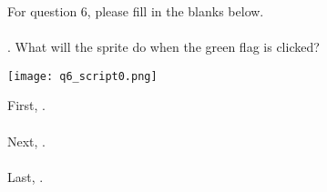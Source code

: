 \noindent For question 6, please fill in the blanks below. \\ \\
. What will the sprite do when the green flag is clicked?
\begin{center}
\texttt{[image: q6\_script0.png]}
\end{center}

\noindent First, \hrulefill . \\ \\
Next, \hrulefill . \\ \\
Last, \hrulefill . \\ \\